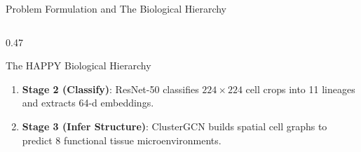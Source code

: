 \documentclass[aspectratio=169, 10pt]{beamer}
\begin{document}
\begin{frame}{Problem Formulation and The Biological Hierarchy}
\begin{columns}[onlytextwidth, t]
\begin{column}{0.47\textwidth}
\begin{block}{The HAPPY Biological Hierarchy}
{\begin{itemize}
\begin{enumerate}
              \item \textbf{Stage 2 (Classify)}: ResNet-50 classifies $224\times 224$ cell crops into 11 lineages and extracts 64-d embeddings.
              \item \textbf{Stage 3 (Infer Structure)}: ClusterGCN builds spatial cell graphs to predict 8 functional tissue microenvironments.
            \end{enumerate}
        \end{itemize}
      }
    \end{block}
  \end{column}
\end{columns}
\end{frame}

\end{document}

